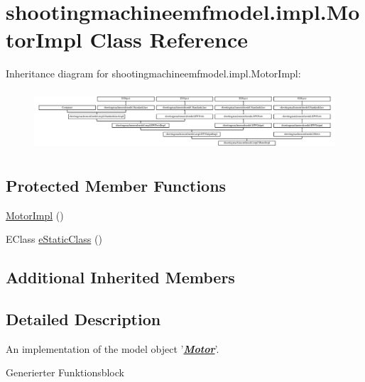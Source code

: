 \hypertarget{classshootingmachineemfmodel_1_1impl_1_1_motor_impl}{\section{shootingmachineemfmodel.\-impl.\-Motor\-Impl Class Reference}
\label{classshootingmachineemfmodel_1_1impl_1_1_motor_impl}
}
Inheritance diagram for shootingmachineemfmodel.\-impl.\-Motor\-Impl\-:\begin{figure}[H]
\begin{center}
\leavevmode
\includegraphics[height=2.247492cm]{classshootingmachineemfmodel_1_1impl_1_1_motor_impl}
\end{center}
\end{figure}
\subsection*{Protected Member Functions}
\begin{DoxyCompactItemize}
\item 
\hyperlink{classshootingmachineemfmodel_1_1impl_1_1_motor_impl_aed067f077153b0ff72021ef6e55bdbea}{Motor\-Impl} ()
\item 
E\-Class \hyperlink{classshootingmachineemfmodel_1_1impl_1_1_motor_impl_aa2afaf659deab591bc2ea26501c96185}{e\-Static\-Class} ()
\end{DoxyCompactItemize}
\subsection*{Additional Inherited Members}


\subsection{Detailed Description}
An implementation of the model object '{\itshape {\bfseries \hyperlink{interfaceshootingmachineemfmodel_1_1_motor}{Motor}}}'.

Generierter Funktionsblock 

